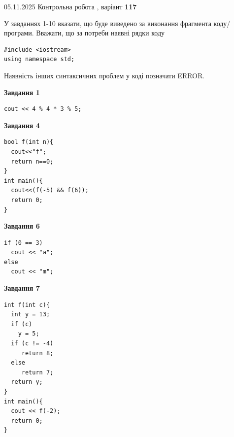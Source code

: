 \documentclass[12pt, ukrainian]{article}
\begin{document}
{\Large{05.11.2025 Контрольна робота , варіант  \No \textbf { 117 }\par}}
{
\begin {large}
У завданнях 1-10 вказати, що буде виведено за виконання фрагмента коду/про\-гра\-ми.
Вважати, що за потреби наявні рядки коду
\begin{verbatim}
#include <iostream>
using namespace std;
\end{verbatim}
Наявність інших синтаксичних проблем у коді позначати ERROR.

\begin{minipage}[t]{7.0cm}

\begin{center}
\textbf{Завдання 1}
\end{center}
\vspace{-8mm}

\begin{verbatim}
cout << 4 % 4 * 3 % 5;
\end{verbatim}



\begin{center}
\textbf{Завдання 4}
\end{center}
\vspace{-8mm}

\begin{verbatim}
bool f(int n){
  cout<<"f";
  return n==0;
}
int main(){
  cout<<(f(-5) && f(6));
  return 0;
}
\end{verbatim}



\begin{center}
\textbf{Завдання 6}
\end{center}
\vspace{-8mm}

\begin{verbatim}
if (0 == 3)
  cout << "a";
else
  cout << "m";
\end{verbatim}



\begin{center}
\textbf{Завдання 7}
\end{center}
\vspace{-8mm}

\begin{verbatim}
int f(int c){
  int y = 13;
  if (c)
    y = 5;
  if (c != -4)
     return 8;
  else
     return 7;
  return y;
}
int main(){
  cout << f(-2);
  return 0;
}
\end{verbatim}


\end{minipage}
\end{large}}
\end{document}
